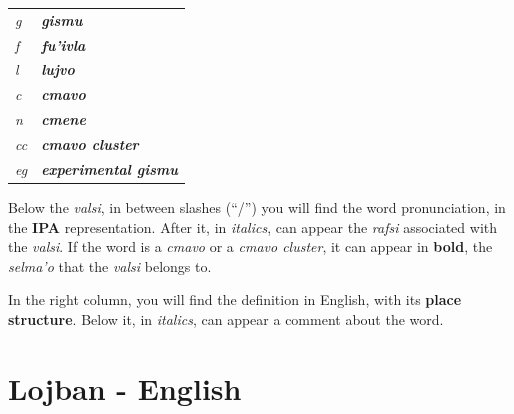 \documentclass[ipa,twoside]{report}
\begin{document}
\begin{tabular}{ l l }
  \textit{g} & \textbf{\emph{gismu}}  \\
  \textit{f} & \textbf{\emph{fu'ivla}}  \\
  \textit{l} & \textbf{\emph{lujvo}}  \\
  \textit{c} & \textbf{\emph{cmavo}} \\
  \textit{n} & \textbf{\emph{cmene}} \\
  \textit{cc} & \textbf{\emph{cmavo cluster}} \\
  \textit{eg} & \textbf{\emph{experimental gismu}} \\
\end{tabular}

Below the \textsl{valsi}, in between slashes (``/'') you will find the word pronunciation, in the \textbf{IPA} representation. After it, in \textit{italics}, can appear the \textsl{rafsi} associated with the \textsl{valsi}. If the word is a \textsl{cmavo} or a \textsl{cmavo cluster}, it can appear in \textbf{bold}, the \textsl{selma'o} that the \textsl{valsi} belongs to.

In the right column, you will find the definition in English, with its \textbf{place structure}. Below it, in \textit{italics}, can appear a comment about the word.
%

\setlength{\headheight}{25pt}
\fancyhead{}					 		%
\fancyfoot{}							%
\fancyhead[LE,LO]{\rightmark}			%
\fancyhead[RE,RO]{\leftmark}			%
\fancyfoot[LE,RO]{\thepage}				%

\setlength{\columnseprule}{0.3pt}
\pagestyle{fancy}
\thispagestyle{plain}

\chapter*{Lojban - English}
\end{document}
